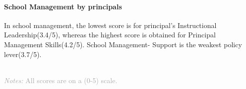 \documentclass[twocolumn]{article}
\let\oldparagraph\paragraph
\renewcommand{\paragraph}[1]{\oldparagraph{#1}\mbox{}}
\begin{document}
\begin{table}[H]
\end{table}

\hypertarget{school-management-by-principals}{%
\paragraph{\texorpdfstring{\textbf{School Management by
principals}}{School Management by principals}}\label{school-management-by-principals}}

In school management, the lowest score is for principal's Instructional
Leadership(3.4/5), whereas the highest score is obtained for Principal
Management Skills(4.2/5). School Management- Support is the weakest
policy lever(3.7/5).

\begin{table}[H]
\\
{\scriptsize
    \textcolor{darkgray}{\textit{Notes:} All scores are on a (0-5) scale.}
  }

\end{table}
\end{document}
